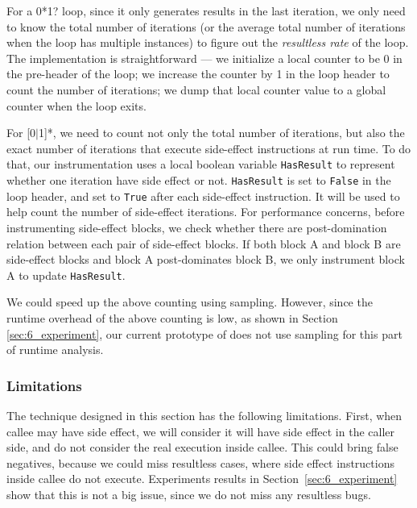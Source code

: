 For a 0*1? loop, since it only generates results in the last iteration, we 
only need to know the total number of iterations (or the average total number 
of iterations when the loop has multiple instances) to figure out the 
\textit{resultless rate} of the loop. The implementation is straightforward
--- we initialize a local counter to be 0 in the pre-header of the loop; we 
increase the counter by 1 in the loop header to count the number of 
iterations; 
we dump that local counter value to a global counter when the loop exits.

For [0$|$1]*, we need to count not only the total number of iterations, but
also the exact number of iterations that execute side-effect instructions
at run time. 
To do that, our instrumentation uses a local boolean variable 
\texttt{HasResult} to represent whether one iteration have side effect or not. 
\texttt{HasResult} is set to \texttt{False} in the loop header, and set to
\texttt{True} after each side-effect instruction. It will be used to help
count the number of side-effect iterations. For performance concerns,
before instrumenting side-effect blocks, we check whether there are 
post-domination relation between each pair of side-effect blocks. 
If both block A and block B are side-effect blocks and block A post-dominates 
block B, we only instrument block A to update \texttt{HasResult}. 

We could speed up the above counting using sampling. However, since the 
runtime overhead of the above counting is low, as shown in Section 
\ref{sec:6_experiment}, our current prototype of \Tool does 
not use sampling for this part of runtime analysis.


\subsubsection{Limitations}
\label{sec:6_l_workless}
The technique designed in this section has the following limitations.
First, when callee may have side effect, we will consider it will have side effect in the caller side, 
and do not consider the real execution inside callee. This could bring false negatives, 
because we could miss resultless cases, 
where side effect instructions inside callee do not execute. 
Experiments results in Section~\ref{sec:6_experiment} show that this is not a big issue, 
since we do not miss any resultless bugs.  


